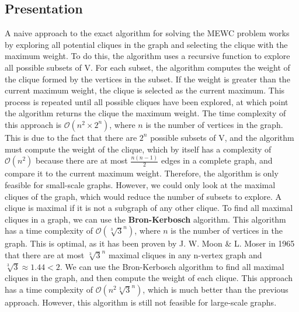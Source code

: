 \subsection{Presentation}

A naive approach to the exact algorithm for solving the MEWC problem works by
exploring all potential cliques in the graph and selecting the clique with the
maximum weight. To do this, the algorithm uses a recursive function to explore
all possible subsets of V. For each subset, the algorithm computes the weight of
the clique formed by the vertices in the subset. If the weight is greater than the
current maximum weight, the clique is selected as the current maximum. This
process is repeated until all possible cliques have been explored, at which point
the algorithm returns the clique the maximum weight.
\newline \newline
The time complexity of this approach is $\mathcal{O}(n^2\times2^n)$, where $n$
is the number of vertices in the graph. This is due to the fact that there are
$2^n$ possible subsets of V, and the algorithm must compute the weight of the clique,
which by itself has a complexity of $\mathcal{O}(n^2)$ because there are at most
$\frac{n(n-1)}{2}$ edges in a complete graph, and compare it to the current
maximum weight. Therefore, the algorithm is only feasible for small-scale graphs.
\newline \newline
However, we could only look at the maximal cliques of the graph, which would
reduce the number of subsets to explore. A clique is maximal if it is not a
subgraph of any other clique. To find all maximal cliques in a graph, we can use
the \textbf{Bron-Kerbosch} algorithm\cite{finding-all-cliques-of-an-undirected-graph}.
This algorithm has a time complexity of $\mathcal{O}(\sqrt[3]{3}^n)$, where $n$
is the number of vertices in the graph. This is optimal, as it has been proven by
J. W. Moon \& L. Moser in 1965\cite{on-cliques-in-graphs} that there are at most
$\sqrt[3]{3}^n$ maximal cliques in any n-vertex graph and $\sqrt[3]{3} \approx 1.44 < 2$.
\newline \newline
We can use the Bron-Kerbosch algorithm to find all maximal cliques in the graph,
and then compute the weight of each clique. This approach has a time complexity of
$\mathcal{O}(n^2\sqrt[3]{3}^n)$, which is much better than the previous
approach. However, this algorithm is still not feasible for large-scale graphs.